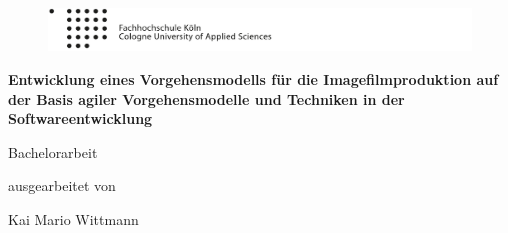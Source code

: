 \begin{titlepage}

\begin{center}

\begin{figure}[!ht]
	\centering
		\includegraphics[natwidth=920pt, natheight=95pt, width=1.0\textwidth]{images/logoheader.pdf}
\end{figure}

\vspace{0.8cm}

\begin{rmfamily}
\begin{huge}
\textbf{Entwicklung eines Vorgehensmodells für die Imagefilmproduktion auf der Basis agiler Vorgehensmodelle und Techniken in der Softwareentwicklung}\\	
\end{huge}
\end{rmfamily}

\vspace{1.6cm}



\begin{LARGE}
\begin{scshape}
Bachelorarbeit\\[0.8em]
\end{scshape}
\end{LARGE}

\begin{large}
ausgearbeitet von\\ 
\vspace{0.2cm}
\begin{LARGE}
Kai Mario Wittmann\\
\end{LARGE}
\end{large}


\end{center}
\end{titlepage}
